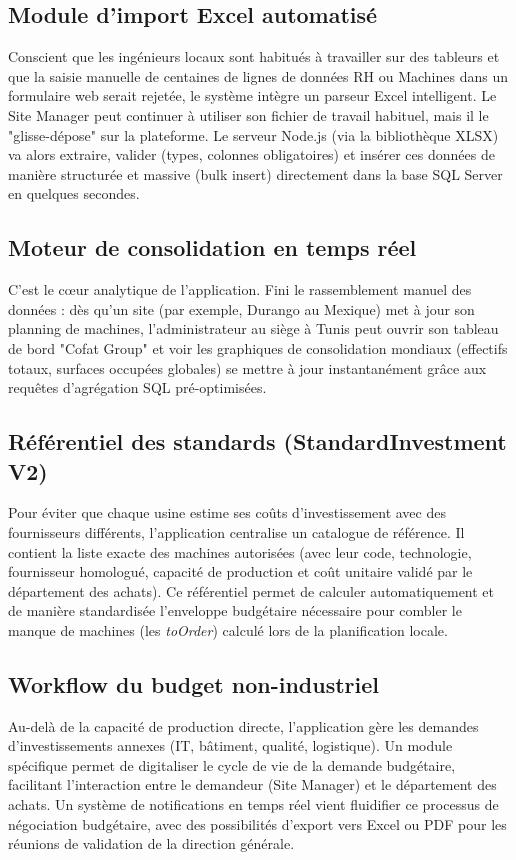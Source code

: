 \subsection{Module d'import Excel automatisé}
Conscient que les ingénieurs locaux sont habitués à travailler sur des tableurs et que la saisie manuelle de centaines de lignes de données RH ou Machines dans un formulaire web serait rejetée, le système intègre un parseur Excel intelligent. Le Site Manager peut continuer à utiliser son fichier de travail habituel, mais il le "glisse-dépose" sur la plateforme. Le serveur Node.js (via la bibliothèque XLSX) va alors extraire, valider (types, colonnes obligatoires) et insérer ces données de manière structurée et massive (bulk insert) directement dans la base SQL Server en quelques secondes.

\subsection{Moteur de consolidation en temps réel}
C'est le cœur analytique de l'application. Fini le rassemblement manuel des données : dès qu'un site (par exemple, Durango au Mexique) met à jour son planning de machines, l'administrateur au siège à Tunis peut ouvrir son tableau de bord "Cofat Group" et voir les graphiques de consolidation mondiaux (effectifs totaux, surfaces occupées globales) se mettre à jour instantanément grâce aux requêtes d'agrégation SQL pré-optimisées.

\subsection{Référentiel des standards (StandardInvestment V2)}
Pour éviter que chaque usine estime ses coûts d'investissement avec des fournisseurs différents, l'application centralise un catalogue de référence. Il contient la liste exacte des machines autorisées (avec leur code, technologie, fournisseur homologué, capacité de production et coût unitaire validé par le département des achats). Ce référentiel permet de calculer automatiquement et de manière standardisée l'enveloppe budgétaire nécessaire pour combler le manque de machines (les \textit{toOrder}) calculé lors de la planification locale.

\subsection{Workflow du budget non-industriel}
Au-delà de la capacité de production directe, l'application gère les demandes d'investissements annexes (IT, bâtiment, qualité, logistique). Un module spécifique permet de digitaliser le cycle de vie de la demande budgétaire, facilitant l'interaction entre le demandeur (Site Manager) et le département des achats. Un système de notifications en temps réel vient fluidifier ce processus de négociation budgétaire, avec des possibilités d'export vers Excel ou PDF pour les réunions de validation de la direction générale.

